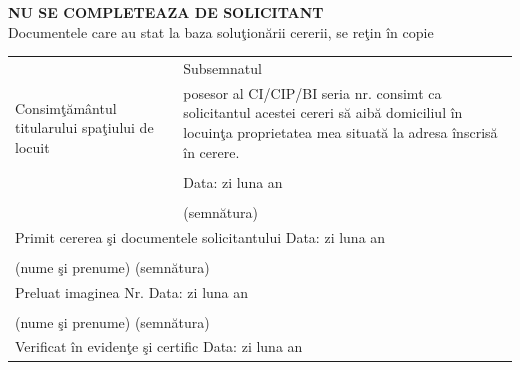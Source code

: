 \documentclass[11pt,a4paper]{article}
\newcommand{\fillline}[1][6cm]{\underline{\hspace{#1}}}
\newcommand{\fillbox}[1][0.4cm]{\framebox[#1]{\rule{0pt}{#1}}}
\begin{document}
\newpage

\begin{center}
\textbf{NU SE COMPLETEAZA DE SOLICITANT}\\
\footnotesize Documentele care au stat la baza soluţionării cererii, se reţin în copie
\end{center}

\normalsize

\begin{tabularx}{\textwidth}{|m{3cm}|X|}
\hline
\multirow{5}{3cm}{Consimţământul titularului spaţiului de locuit} & Subsemnatul \fillline[10cm] \\
 & posesor al CI/CIP/BI seria \fillline[2cm] nr. \fillline[4cm] consimt ca solicitantul acestei cereri să aibă domiciliul în locuinţa proprietatea mea situată la adresa înscrisă în cerere. \\
 & \\
 & Data: \hspace{0.3cm} zi \fillbox\fillbox \hspace{0.3cm} luna \fillbox\fillbox \hspace{0.3cm} an \fillbox\fillbox\fillbox\fillbox \\
 & \hfill \fillline[5cm] \\
 & \hfill (semnătura) \\
\hline
\multicolumn{2}{|l|}{Primit cererea şi documentele solicitantului \hfill Data: \hspace{0.3cm} zi \fillbox\fillbox \hspace{0.3cm} luna \fillbox\fillbox \hspace{0.3cm} an \fillbox\fillbox\fillbox\fillbox} \\
\multicolumn{2}{|l|}{\fillline[6cm] \hfill \fillline[5cm]} \\
\multicolumn{2}{|l|}{\footnotesize (nume şi prenume) \hfill (semnătura)} \\
\hline
\multicolumn{2}{|l|}{Preluat imaginea \hspace{0.3cm} Nr. \fillline[4cm] \hfill Data: \hspace{0.3cm} zi \fillbox\fillbox \hspace{0.3cm} luna \fillbox\fillbox \hspace{0.3cm} an \fillbox\fillbox\fillbox\fillbox} \\
\multicolumn{2}{|l|}{\fillline[6cm] \hfill \fillline[5cm]} \\
\multicolumn{2}{|l|}{\footnotesize (nume şi prenume) \hfill (semnătura)} \\
\hline
\multicolumn{2}{|l|}{Verificat în evidenţe şi certific \hfill Data: \hspace{0.3cm} zi \fillbox\fillbox \hspace{0.3cm} luna \fillbox\fillbox \hspace{0.3cm} an \fillbox\fillbox\fillbox\fillbox} \\

\end{tabularx}
\end{document}
